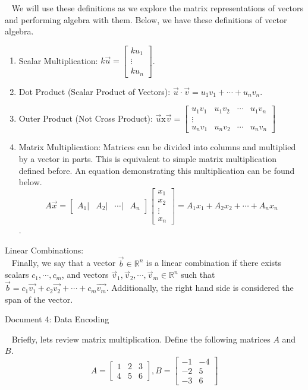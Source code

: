 \documentclass[12pt]{article}
\begin{document}
$\,\,\,$ We will use these definitions as we explore the matrix representations of vectors and performing algebra with them. Below, we have these definitions of vector algebra.
\begin{enumerate}
\item Scalar Multiplication: $k\vec{u}=\begin{bmatrix}ku_1\\ \vdots\\ku_n \end{bmatrix}$.
\item Dot Product (Scalar Product of Vectors): $\vec{u}\cdot\vec{v}=u_1v_1+\cdots +u_nv_n$.
\item Outer Product (Not Cross Product): $\vec{u}\text{x}\vec{v}=\begin{bmatrix}u_1v_1 & u_1v_2 & \cdots & u_1v_n\\
\vdots\\
u_nv_1 & u_nv_2 & \cdots & u_nv_n
\end{bmatrix}$
\item Matrix Multiplication: Matrices can be divided into columns and multiplied by a vector in parts. This is equivalent to simple matrix multiplication defined before. An equation demonstrating this multiplication can be found below. $$A\vec{x}=\begin{bmatrix}\!\left. A_1 \right| & \left. \!\!\!\! A_2 \right| & \!\!\!\! \left. \cdots \right| & \!\!\!\! A_n\end{bmatrix}\begin{bmatrix}x_1\\ x_2\\ \vdots\\ x_n\end{bmatrix}=A_1x_1+A_2x_2+\cdots+A_nx_n$$.
\end{enumerate}

Linear Combinations:\\

$\,\,\,$ Finally, we say that a vector $\vec{b}\in\mathbb{R}^n$ is a linear combination if there exists scalars $c_1,\cdots,c_m$, and vectors $\vec{v}_1,\vec{v}_2,\cdots,\vec{v}_m\in\mathbb{R}^n$ such that $\vec{b}=c_1\vec{v_1}+c_2\vec{v_2}+\cdots+c_m\vec{v_m}$. Additionally, the right hand side is considered the span of the vector.

\newpage
\begin{center}
Document 4: Data Encoding
\end{center}

\setlength{\leftskip}{0 in}
$\,\,\,$ Briefly, lets review matrix multiplication. Define the following matrices $A$ and $B$.
$$A=\begin{bmatrix}
1 & 2 & 3\\4 & 5 & 6
\end{bmatrix},
B=\left[\begin{matrix}
-1 & -4\\-2 & 5\\-3 & 6
\end{matrix}\right]$$
\end{document}
